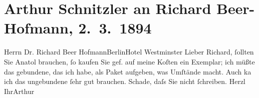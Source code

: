 

         
         \newcommand{\erwaehntePersonen}{Personen: Richard Beer-Hofmann}
         \newcommand{\erwaehnteInstitutionen}{}
         \newcommand{\erwaehnteOrte}{Orte: Berlin, Hotel Westminster, IX., Alsergrund, Wien}
         \newcommand{\erwaehnteWerke}{Werke: Anatol}
               \section[Arthur Schnitzler an Richard Beer-Hofmann, 2. 3. 1894]{ Arthur Schnitzler an Richard Beer-Hofmann, 2. 3. 1894}\nopagebreak{}\rehead{ }\begin{ledgroupsized}[t]{13cm}\normalsize\beginnumbering \toendnotes[C]{\smallbreak\pagebreak[2]} 
\pstart{}{\pb}Herrn Dr. Richard Beer Hofmann\pend{}\pstart{}Berlin\pend{}\pstart{}Hotel Westminster\pend{}{\bigskip}\pstart
           \noindent{}{\pb}Lieber Richard, ſollten Sie Anatol brauchen, ſo kaufen Sie gef. auf meine
               Koſten ein Exemplar; ich müßte das gebundene, das ich habe, als Paket aufgeben, was
               Umſtände macht. Auch ka{\geminationn} ich das ungebundene ſehr gut
               brauchen. Schade, daſs Sie nicht ſchreiben.\pend
           \pstart Herzl Ihr\spacefill\mbox{Arthur}\pend{}
         
         \endnumbering{}\end{ledgroupsized}  \newcommand{\dateiname}{L00303}\newcommand{\titel}{Arthur Schnitzler an Richard Beer-Hofmann, 2. 3. 1894}\newcommand{\editorInnen}{Martin Anton Müller und Gerd-Hermann Susen}
      
